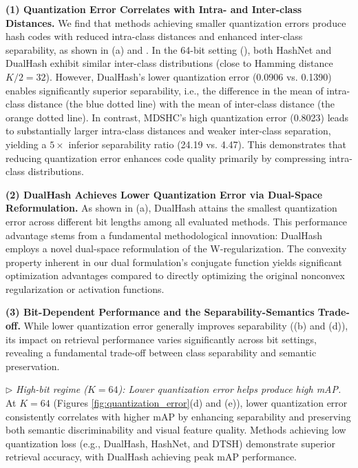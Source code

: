 \noindent\textbf{(1) Quantization Error Correlates with Intra- and Inter-class Distances.}
We find that methods achieving smaller quantization errors produce hash codes with reduced intra-class distances and enhanced inter-class separability, as shown in (a) and . In the 64-bit setting (), both HashNet and DualHash exhibit similar inter-class distributions (close to Hamming distance $K/2 = 32$). However, DualHash's lower quantization error (0.0906 vs. 0.1390) enables significantly superior separability, i.e., the difference in the mean of intra-class distance (the blue dotted line)
with the mean of inter-class distance (the orange dotted line). In contrast, MDSHC's high quantization error (0.8023) leads to substantially larger intra-class distances and weaker inter-class separation, yielding a $5\times$ inferior separability ratio (24.19 vs. 4.47). 
This demonstrates that reducing quantization error enhances code quality primarily by compressing intra-class distributions.

\noindent\textbf{(2) DualHash Achieves Lower Quantization Error via Dual-Space Reformulation.}
As shown in (a), DualHash attains the smallest quantization error across different bit lengths among all evaluated methods. This performance advantage stems from a fundamental methodological innovation: DualHash employs a novel dual-space reformulation of the W-regularization. The convexity property inherent in our dual formulation's conjugate function yields significant optimization advantages compared to directly optimizing the original nonconvex regularization or activation functions. 

\noindent\textbf{(3) Bit-Dependent Performance and the Separability-Semantics Trade-off.}
While lower quantization error generally improves separability ((b) and (d)), its impact on retrieval performance varies significantly across bit settings, revealing a fundamental trade-off between class separability and semantic preservation.

\noindent\(\triangleright\) \textit{High-bit regime ($K = 64$): Lower quantization error helps produce high mAP.}
At $K = 64$ (Figures \ref{fig:quantization_error}(d) and (e)), lower quantization error consistently correlates with higher mAP by enhancing separability and preserving both semantic discriminability and visual feature quality. Methods achieving low quantization loss (e.g., DualHash, HashNet, and DTSH) demonstrate superior retrieval accuracy, with DualHash achieving peak mAP performance.

